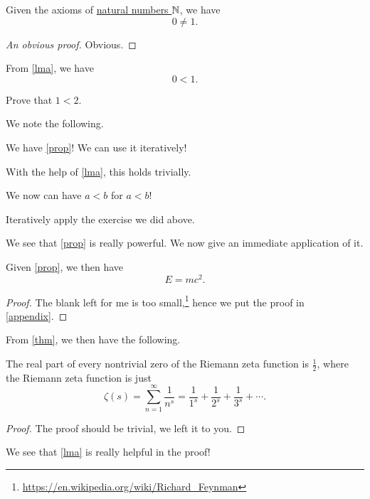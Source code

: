 \begin{lemma}\label{lma}
  Given the axioms of \hyperref[def]{natural numbers \(\mathbb{\MakeUppercase{n}} \)}, we have
  \[
    0\neq 1.
  \]
\end{lemma}
\begin{proof}[An obvious proof]
  Obvious.
\end{proof}
\begin{proposition}\label{prop}
  From \autoref{lma}, we have
  \[
    0<1.
  \]
\end{proposition}
\begin{exercise}
  Prove that \(1 < 2\).
\end{exercise}
\begin{answer}
  We note the following.
  \begin{note}
    We have \autoref{prop}! We can use it iteratively!
  \end{note}
  With the help of \autoref{lma}, this holds trivially.
\end{answer}
\begin{eg}
  We now can have \(a < b\) for \(a < b\)!
\end{eg}
\begin{explanation}
  Iteratively apply the exercise we did above.
\end{explanation}
\begin{remark}
  We see that \autoref{prop} is really powerful. We now give an immediate application of it.
\end{remark}

\begin{theorem}\label{thm}
  Given \autoref{prop}, we then have
  \[
    E = mc^2.
  \]
\end{theorem}
\begin{proof}
  The blank left for me is too small,\footnote{\url{https://en.wikipedia.org/wiki/Richard_Feynman}} hence we put the proof in \autoref{appendix}.
\end{proof}

From \autoref{thm}, we then have the following.
\begin{corollary}\label{col}
  The real part of every nontrivial zero of the Riemann zeta function is \(\frac{1}{2}\), where the Riemann zeta function is just
  \[
    \zeta (s)=\sum _{n=1}^{\infty }{\frac {1}{n^{s}}}={\frac {1}{1^{s}}}+{\frac {1}{2^{s}}}+{\frac {1}{3^{s}}}+\cdots.
  \]
\end{corollary}
\begin{proof}
  The proof should be trivial, we left it to you.
\end{proof}
\begin{prev}
  We see that \autoref{lma} is really helpful in the proof!
\end{prev}

